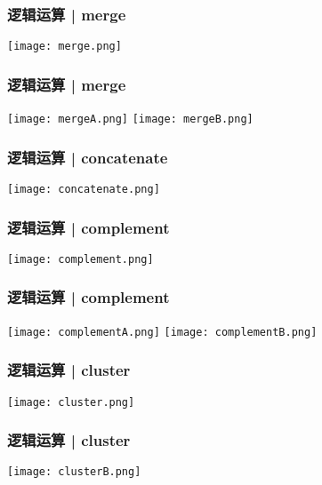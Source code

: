 \begin{frame}
  \frametitle{逻辑运算 | merge}
    \begin{center}
      \texttt{[image: merge.png]}
    \end{center}
\end{frame}

\begin{frame}
  \frametitle{逻辑运算 | merge}
    \begin{center}
      \texttt{[image: mergeA.png]}
      \vspace{0.5cm}
      \texttt{[image: mergeB.png]}
    \end{center}
\end{frame}

\begin{frame}
  \frametitle{逻辑运算 | concatenate}
    \begin{center}
      \texttt{[image: concatenate.png]}
    \end{center}
\end{frame}

\begin{frame}
  \frametitle{逻辑运算 | complement}
    \begin{center}
      \texttt{[image: complement.png]}
    \end{center}
\end{frame}

\begin{frame}
  \frametitle{逻辑运算 | complement}
    \begin{center}
      \texttt{[image: complementA.png]}
      \vspace{0.5cm}
      \texttt{[image: complementB.png]}
    \end{center}
\end{frame}

\begin{frame}
  \frametitle{逻辑运算 | cluster}
    \begin{center}
      \texttt{[image: cluster.png]}
    \end{center}
\end{frame}

\begin{frame}
  \frametitle{逻辑运算 | cluster}
    \begin{center}
      \texttt{[image: clusterB.png]}
    \end{center}
\end{frame}

